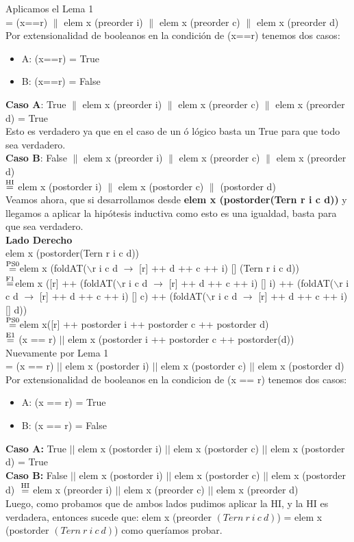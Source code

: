 \documentclass{article}
\begin{document}
Aplicamos el Lema 1 \\
= (x==r) $\|$ elem x (preorder i) $\|$ elem x (preorder c) $\|$ elem x (preorder d) \\
Por extensionalidad de booleanos en la condición de (x==r) tenemos dos casos:
\begin{itemize}
\item A: (x==r) = True 
\item B: (x==r) = False
\end{itemize}
\textbf{Caso A}: True $\|$ elem x (preorder i) $\|$ elem x (preorder c) $\|$ elem x (preorder d) = True \\
Esto es verdadero ya que en el caso de un ó lógico basta un True para que todo sea verdadero.  \\  
\textbf{Caso B}: False $\|$ elem x (preorder i) $\|$ elem x (preorder c) $\|$ elem x (preorder d) \\ 
$\stackrel{\text{HI}}{=}$ elem x (postorder i) $\|$ elem x (postorder c) $\|$ (postorder d) \\

Veamos ahora, que si desarrollamos desde \textbf{elem x (postorder(Tern r i c d))} y llegamos a aplicar la hipótesis inductiva como esto es una igualdad, basta para que sea verdadero. \\

\textbf{Lado Derecho} \\
elem x (postorder(Tern r i c d)) \\
$\stackrel{\text{PS0}}{=}$elem x (foldAT($\backslash$r i c d $\rightarrow$ [r] ++ d ++ c ++ i) [] (Tern r i c d))    \\
$\stackrel{\text{F1}}{=}$elem x ([r] ++ (foldAT($\backslash$r i c d $\rightarrow$ [r] ++ d ++ c ++ i) [] i) ++ (foldAT($\backslash$r i c d $\rightarrow$ [r] ++ d ++ c ++ i) [] c) ++ (foldAT($\backslash$r i c d $\rightarrow$ [r] ++ d ++ c ++ i) [] d)) \\
$\stackrel{\text{PS0}}{=}$elem x([r] ++ postorder i ++ postorder c ++ postorder d) \\
$\stackrel{\text{E1}}{=}$ (x == r) $||$ elem x (postorder i ++ postorder c ++ postorder(d)) \\
Nuevamente por Lema 1 \\
= (x == r) $||$ elem x (postorder i) $||$ elem x (postorder c) $||$ elem x (postorder d)\\
Por extensionalidad de booleanos en la condicion de (x == r) tenemos dos casos:
\begin{itemize}
    \item A: (x == r) = True
    \item B: (x == r) = False
\end{itemize}
\textbf{Caso A:} True $||$ elem x (postorder i) $||$ elem x (postorder c) $||$ elem x (postorder d) = True \\
\textbf{Caso B:} False $||$ elem x (postorder i) $||$ elem x (postorder c) $||$ elem x (postorder d) $\\ \stackrel{\text{HI}}{=} $  elem x (preorder i) $||$ elem x (preorder c) $||$ elem x (preorder d) \\
Luego, como probamos que de ambos lados pudimos aplicar la HI, y la HI es verdadera, entonces sucede que: elem x (preorder $(Tern \ r \ i \ c \ d)$) = elem x (postorder $(Tern \ r \ i \ c \ d)$) como queríamos probar.
\end{document}
